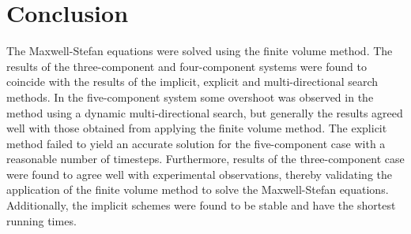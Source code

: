 \documentclass[11]{Report}
\begin{document}
\section*{Conclusion}
The Maxwell-Stefan equations were solved using the finite volume method. The results of the three-component and four-component systems were found to coincide with the results of the implicit, explicit and multi-directional search methods. In the five-component system some overshoot was observed in the method using a dynamic multi-directional search, but generally the results agreed well with those obtained from applying the finite volume method. The explicit method failed to yield an accurate solution for the five-component case with a reasonable number of timesteps. Furthermore, results of the three-component case were found to agree well with experimental observations, thereby validating the application of the finite volume method to solve the Maxwell-Stefan equations. Additionally, the implicit schemes were found to be stable and have the shortest running times.
\end{document}
